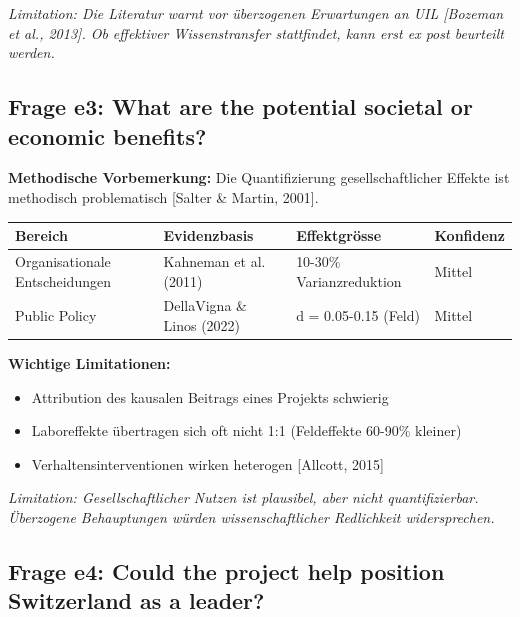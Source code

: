 \documentclass[11pt,a4paper]{article}
\newcommand{\limitation}[1]{\textcolor{limitation}{\textit{Limitation: #1}}}
\newcommand{\evidence}[1]{\textcolor{fehrgray}{[#1]}}
\begin{document}
\limitation{Die Literatur warnt vor überzogenen Erwartungen an UIL \evidence{Bozeman et al., 2013}. Ob effektiver Wissenstransfer stattfindet, kann erst ex post beurteilt werden.}

\subsection{Frage e3: What are the potential societal or economic benefits?}

\textbf{Methodische Vorbemerkung:} Die Quantifizierung gesellschaftlicher Effekte ist methodisch problematisch \evidence{Salter \& Martin, 2001}.

\begin{table}[h]
\centering
\begin{tabular}{@{}L{3.5cm}L{3.5cm}L{3.5cm}C{2.5cm}@{}}
\toprule
\textbf{Bereich} & \textbf{Evidenzbasis} & \textbf{Effektgrösse} & \textbf{Konfidenz} \\
\midrule
Organisationale Entscheidungen & Kahneman et al. (2011) & 10-30\% Varianzreduktion & Mittel \\
Public Policy & DellaVigna \& Linos (2022) & d = 0.05-0.15 (Feld) & Mittel \\
\bottomrule
\end{tabular}
\end{table}

\textbf{Wichtige Limitationen:}
\begin{itemize}[leftmargin=2em]
    \item Attribution des kausalen Beitrags eines Projekts schwierig
    \item Laboreffekte übertragen sich oft nicht 1:1 (Feldeffekte 60-90\% kleiner)
    \item Verhaltensinterventionen wirken heterogen \evidence{Allcott, 2015}
\end{itemize}

\limitation{Gesellschaftlicher Nutzen ist plausibel, aber nicht quantifizierbar. Überzogene Behauptungen würden wissenschaftlicher Redlichkeit widersprechen.}

\subsection{Frage e4: Could the project help position Switzerland as a leader?}
\end{document}
